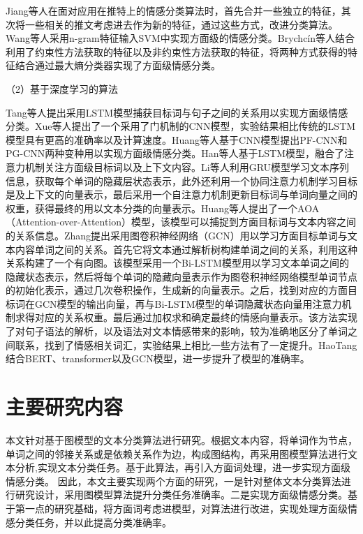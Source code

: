Jiang等人在面对应用在推特上的情感分类算法时，首先合并一些独立的特征，其次将一些相关的推文考虑进去作为新的特征，通过这些方式，改进分类算法。Wang等人采用n-gram特征输入SVM中实现方面级的情感分类。Brychcín等人结合利用了约束性方法获取的特征以及非约束性方法获取的特征，将两种方式获得的特征结合通过最大熵分类器实现了方面级情感分类。

（2）基于深度学习的算法

Tang等人提出采用LSTM模型捕获目标词与句子之间的关系用以实现方面级情感分类。Xue等人提出了一个采用了门机制的CNN模型，实验结果相比传统的LSTM模型具有更高的准确率以及计算速度。Huang等人基于CNN模型提出PF-CNN和PG-CNN两种变种用以实现方面级情感分类。Han等人基于LSTM模型，融合了注意力机制关注方面级目标词以及上下文内容。Li等人利用GRU模型学习文本序列信息，获取每个单词的隐藏层状态表示，此外还利用一个协同注意力机制学习目标是及上下文的向量表示，最后采用一个自注意力机制更新目标词与单词向量之间的权重，获得最终的用以文本分类的向量表示。Huang等人提出了一个AOA（Attention-over-Attention）模型，该模型可以捕捉到方面目标词与文本内容之间的关系信息。Zhang提出采用图卷积神经网络（GCN）用以学习方面目标单词与文本内容单词之间的关系。首先它将文本通过解析树构建单词之间的关系，利用这种关系构建了一个有向图。该模型采用一个Bi-LSTM模型用以学习文本单词之间的隐藏状态表示，然后将每个单词的隐藏向量表示作为图卷积神经网络模型单词节点的初始化表示，通过几次卷积操作，生成新的向量表示。之后，找到对应的方面目标词在GCN模型的输出向量，再与Bi-LSTM模型的单词隐藏状态向量用注意力机制求得对应的关系权重。最后通过加权求和确定最终的情感向量表示。该方法实现了对句子语法的解析，以及语法对文本情感带来的影响，较为准确地区分了单词之间联系，找到了情感相关词汇，实验结果上相比一些方法有了一定提升。HaoTang结合BERT、transformer以及GCN模型，进一步提升了模型的准确率。

\section{主要研究内容}
本文针对基于图模型的文本分类算法进行研究。根据文本内容，将单词作为节点，单词之间的邻接关系或是依赖关系作为边，构成图结构，再采用图模型算法进行文本分析,实现文本分类任务。基于此算法，再引入方面词处理，进一步实现方面级情感分类。
因此，本文主要实现两个方面的研究，一是针对整体文本分类算法进行研究设计，采用图模型算法提升分类任务准确率。二是实现方面级情感分类。基于第一点的研究基础，将方面词考虑进模型，对算法进行改进，实现处理方面级情感分类任务，并以此提高分类准确率。
